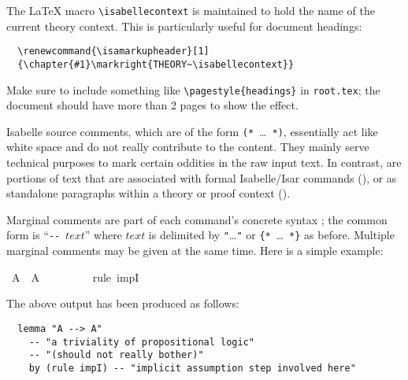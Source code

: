 \begin{isabellebody}
\begin{isamarkuptext}
  \medskip The {\LaTeX} macro \verb,\isabellecontext, is maintained to
  hold the name of the current theory context.  This is particularly
  useful for document headings:

\begin{verbatim}
  \renewcommand{\isamarkupheader}[1]
  {\chapter{#1}\markright{THEORY~\isabellecontext}}
\end{verbatim}

  \noindent Make sure to include something like
  \verb,\pagestyle{headings}, in \texttt{root.tex}; the document
  should have more than 2 pages to show the effect.%
\end{isamarkuptext}%
\isamarkuptrue%
%
\isamarkuptrue%
%
\begin{isamarkuptext}%
Isabelle source comments, which are of the form
  \verb,(,\verb,*,~\dots~\verb,*,\verb,),, essentially act like white
  space and do not really contribute to the content.  They mainly
  serve technical purposes to mark certain oddities in the raw input
  text.  In contrast,  are portions of text
  that are associated with formal Isabelle/Isar commands
  (), or as standalone paragraphs within a
  theory or proof context ().

  \medskip Marginal comments are part of each command's concrete
  syntax \cite{isabelle-ref}; the common form is ``\verb,--,~$text$''
  where $text$ is delimited by \verb,",\dots\verb,", or
  \verb,{,\verb,*,~\dots~\verb,*,\verb,}, as before.  Multiple
  marginal comments may be given at the same time.  Here is a simple
  example:%
\end{isamarkuptext}%
\isamarkuptrue%
\ {\isachardoublequote}A\ {\isacharminus}{\isacharminus}{\isachargreater}\ A{\isachardoublequote}\isanewline
\ \ %
\isanewline
\ \ %
\isanewline
\ \ \isamarkupfalse%
\ {\isacharparenleft}rule\ impI{\isacharparenright}\ %
\isamarkupfalse%
%
\begin{isamarkuptext}%
\noindent The above output has been produced as follows:

\begin{verbatim}
  lemma "A --> A"
    -- "a triviality of propositional logic"
    -- "(should not really bother)"
    by (rule impI) -- "implicit assumption step involved here"
\end{verbatim}


\end{isamarkuptext}
\end{isabellebody}
